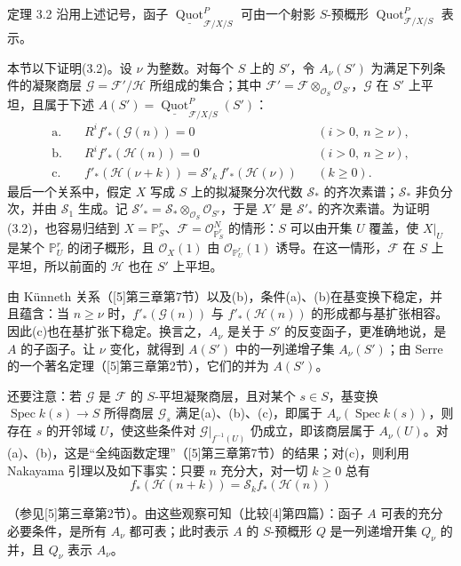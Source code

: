 \begin{statement}{定理 3.2}
沿用上述记号，函子 $\underline{\operatorname{Quot}}^{P}_{\mathcal F/X/S}$ 可由一个射影 $S$-预概形 $\operatorname{Quot}^{P}_{\mathcal F/X/S}$ 表示。
\end{statement}
本节以下证明(3.2)。设 $\nu$ 为整数。对每个 $S$ 上的 $S'$，令 $A_\nu(S')$ 为满足下列条件的凝聚商层 $\mathcal G=\mathcal F'/\mathcal H$ 所组成的集合；其中 $\mathcal F'=\mathcal F\otimes_{\mathcal O_S}\mathcal O_{S'}$，$\mathcal G$ 在 $S'$ 上平坦，且属于下述 $A(S')=\underline{\operatorname{Quot}}^P_{\mathcal F/X/S}(S')$：
\begin{align*}
\text{a.}\quad &R^if'_*(\mathcal G(n))=0 &&(i>0,\ n\geq\nu),\\
\text{b.}\quad &R^if'_*(\mathcal H(n))=0 &&(i>0,\ n\geq\nu),\\
\text{c.}\quad &f'_*(\mathcal H(\nu+k))=\mathcal S'_k\,f'_*(\mathcal H(\nu)) &&(k\geq0).
\end{align*}
最后一个关系中，假定 $X$ 写成 $S$ 上的拟凝聚分次代数 $\mathcal S_*$ 的齐次素谱；$\mathcal S_*$ 非负分次，并由 $\mathcal S_1$ 生成。记 $\mathcal S'_* =\mathcal S_*\otimes_{\mathcal O_S}\mathcal O_{S'}$，于是 $X'$ 是 $\mathcal S'_*$ 的齐次素谱。为证明(3.2)，也容易归结到 $X=\mathbb P^r_S$、$\mathcal F=\mathcal O_{\mathbb P^r_S}^{N}$ 的情形：$S$ 可以由开集 $U$ 覆盖，使 $X|_U$ 是某个 $\mathbb P^r_U$ 的闭子概形，且 $\mathcal O_X(1)$ 由 $\mathcal O_{\mathbb P^r_U}(1)$ 诱导。在这一情形，$\mathcal F$ 在 $S$ 上平坦，所以前面的 $\mathcal H$ 也在 $S'$ 上平坦。

由 Künneth 关系（[5]第三章第7节）以及(b)，条件(a)、(b)在基变换下稳定，并且蕴含：当 $n\geq\nu$ 时，$f'_*(\mathcal G(n))$ 与 $f'_*(\mathcal H(n))$ 的形成都与基扩张相容。因此(c)也在基扩张下稳定。换言之，$A_\nu$ 是关于 $S'$ 的反变函子，更准确地说，是 $A$ 的子函子。让 $\nu$ 变化，就得到 $A(S')$ 中的一列递增子集 $A_\nu(S')$；由 Serre 的一个著名定理（[5]第三章第2节），它们的并为 $A(S')$。

还要注意：若 $\mathcal G$ 是 $\mathcal F$ 的 $S$-平坦凝聚商层，且对某个 $s\in S$，基变换 $\operatorname{Spec}k(s)\to S$ 所得商层 $\mathcal G_s$ 满足(a)、(b)、(c)，即属于 $A_\nu(\operatorname{Spec}k(s))$，则存在 $s$ 的开邻域 $U$，使这些条件对 $\mathcal G|_{f^{-1}(U)}$ 仍成立，即该商层属于 $A_\nu(U)$。对(a)、(b)，这是“全纯函数定理”（[5]第三章第7节）的结果；对(c)，则利用 Nakayama 引理以及如下事实：只要 $n$ 充分大，对一切 $k\geq0$ 总有
\[
f_*(\mathcal H(n+k))=\mathcal S_k f_*(\mathcal H(n))
\]

（参见[5]第三章第2节）。由这些观察可知（比较[4]第四篇）：函子 $A$ 可表的充分必要条件，是所有 $A_\nu$ 都可表；此时表示 $A$ 的 $S$-预概形 $Q$ 是一列递增开集 $Q_\nu$ 的并，且 $Q_\nu$ 表示 $A_\nu$。

